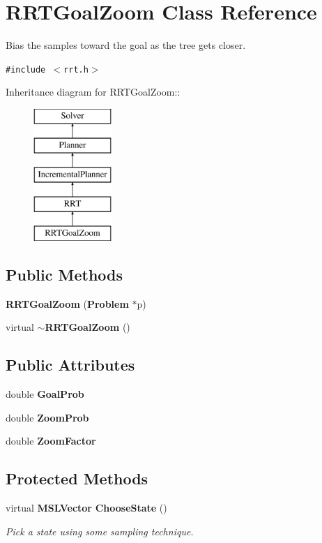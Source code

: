 \section{RRTGoal\-Zoom  Class Reference}
\label{classRRTGoalZoom}
Bias the samples toward the goal as the tree gets closer. 


{\tt \#include $<$rrt.h$>$}

Inheritance diagram for RRTGoal\-Zoom::\begin{figure}[H]
\begin{center}
\leavevmode
\includegraphics[height=5cm]{classRRTGoalZoom}
\end{center}
\end{figure}
\subsection*{Public Methods}
\begin{CompactItemize}
\item 
{\bf RRTGoal\-Zoom} ({\bf Problem} $\ast$p)
\item 
virtual {\bf $\sim$RRTGoal\-Zoom} ()
\end{CompactItemize}
\subsection*{Public Attributes}
\begin{CompactItemize}
\item 
double {\bf Goal\-Prob}
\item 
double {\bf Zoom\-Prob}
\item 
double {\bf Zoom\-Factor}
\end{CompactItemize}
\subsection*{Protected Methods}
\begin{CompactItemize}
\item 
virtual {\bf MSLVector} {\bf Choose\-State} ()
\begin{CompactList}\small\item\em Pick a state using some sampling technique.\item\end{CompactList}\end{CompactItemize}


